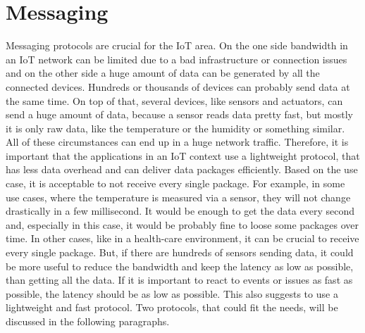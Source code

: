 \section{Messaging}
Messaging protocols are crucial for the \ac{IoT} area.
On the one side bandwidth in an \ac{IoT} network can be limited due to a bad infrastructure or connection issues and on the other side a huge amount of data can be generated by all the connected devices.\autocite[cf.][p. 71]{Luzuriaga:2017}
Hundreds or thousands of devices can probably send data at the same time.\autocite[cf.][p. 71]{Luzuriaga:2017}
On top of that, several devices, like sensors and actuators, can send a huge amount of data, because a sensor reads data pretty fast, but mostly it is only raw data, like the temperature or the humidity or something similar.
All of these circumstances can end up in a huge network traffic.
Therefore, it is important that the applications in an \ac{IoT} context use a lightweight protocol, that has less data overhead and can deliver data packages efficiently.\autocite[cf.][p. 2 f.]{Kraijak:2015}
Based on the use case, it is acceptable to not receive every single package.
For example, in some use cases, where the temperature is measured via a sensor, they will not change drastically in a few millisecond.
It would be enough to get the data every second and, especially in this case, it would be probably fine to loose some packages over time.
In other cases, like in a health-care environment, it can be crucial to receive every single package.\autocite[cf.][p. 502]{Hedi:2017}
But, if there are hundreds of sensors sending data, it could be more useful to reduce the bandwidth and keep the latency as low as possible, than getting all the data.\autocite[cf.][p. 2 f.]{Kraijak:2015}
If it is important to react to events or issues as fast as possible, the latency should be as low as possible.\autocite[cf.][p. 502]{Hedi:2017}
This also suggests to use a lightweight and fast protocol.
Two protocols, that could fit the needs, will be discussed in the following paragraphs.

